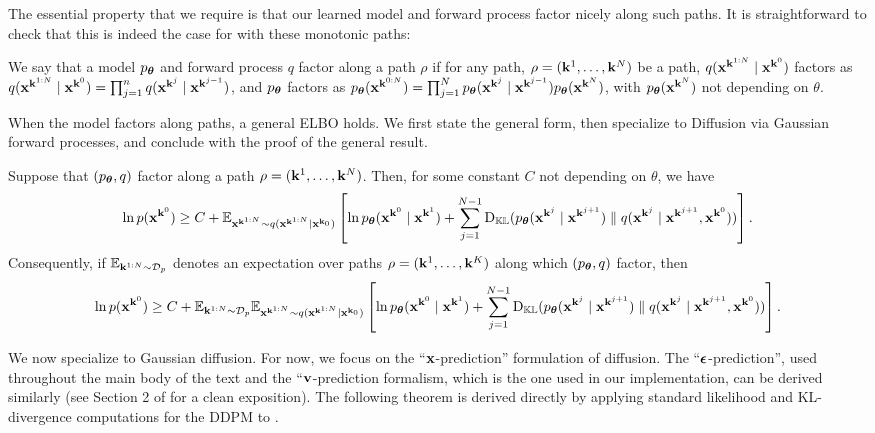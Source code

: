 The essential property that we require is that our learned model and forward process factor nicely along such paths. It is straightforward to check that this is indeed the case for \method with these monotonic paths:


\begin{definition}
\label{defn:factoring} We say that a model $p_{\bm{\theta}}$ and forward process $q$ factor along a path $\rho$ if for any path, $\rho = (\mathbf{k}^1,\dots,\mathbf{k}^N)$ be a path,  $q({\mathbf{x}}^{\mathbf{k}^{1:N}}
 \mid {\mathbf{x}}^{\mathbf{k}^0})$ factors as $q({\mathbf{x}}^{\mathbf{k}^{1:N}}
 \mid {\mathbf{x}}^{\mathbf{k}^0}) = \prod_{j=1}^n q({\mathbf{x}}^{\mathbf{k}^j}\mid {\mathbf{x}}^{\mathbf{k}^{j-1}})$, and  $p_{\bm{\theta}} $ factors as $p_{\bm{\theta}}({\mathbf{x}}^{\mathbf{k}^{0:N}}) = \prod_{j=1}^N p_{\bm{\theta}}({\mathbf{x}}^{\mathbf{k}^j}\mid {\mathbf{x}}^{\mathbf{k}^{j-1}})p_{\bm{\theta}}({\mathbf{x}}^{\mathbf{k}^N})$, with $p_{\bm{\theta}}({\mathbf{x}}^{\mathbf{k}^N})$ not depending on $\theta$. 
\end{definition}
When the model factors along paths, a general ELBO holds. We first state the general form, then specialize to Diffusion via Gaussian forward processes, and conclude with the proof of the general result.
\begin{theorem}\label{thm:ELBO} Suppose that $(p_{\bm{\theta}},q)$ factor along a path $\rho = (\mathbf{k}^1,\dots,\mathbf{k}^N)$. Then, for some constant $C$ not depending on $\theta$, we have
 \begin{align}
     \ln p({\mathbf{x}}^{\mathbf{k}^0}) \ge C + \mathbb{E}_{{\mathbf{x}}^{\mathbf{k}^{1:N}} \sim q({\mathbf{x}}^{\mathbf{k}^{1:N}}\mid {\mathbf{x}}^{\mathbf{k}_0})}\left[\ln {p_{\bm{\theta}}({\mathbf{x}}^{\mathbf{k}^0} \mid {\mathbf{x}}^{\mathbf{k}^1})} + \sum_{j=1}^{N-1} \mathrm{D}_{\mathbb{KL}}({p_{\bm{\theta}}({\mathbf{x}}^{\mathbf{k}^{j}} \mid {\mathbf{x}}^{\mathbf{k}^{j+1}})}\parallel {q({\mathbf{x}}^{\mathbf{k}^{j}} \mid {\mathbf{x}}^{\mathbf{k}^{j+1}},{\mathbf{x}}^{\mathbf{k}^0})})\right].
 \end{align}
 Consequently, if $\mathbb{E}_{\mathbf{k}^{1:N} \sim {\mathcal{D}}_{p}}$ denotes an expectation over paths $\rho = (\mathbf{k}^1,\dots,\mathbf{k}^K)$ along which $(p_{\bm{\theta}},q)$ factor, then 
    \begin{align*}
     \ln p({\mathbf{x}}^{\mathbf{k}^0}) \ge C + \mathbb{E}_{\mathbf{k}^{1:N} \sim {\mathcal{D}}_{p}}\mathbb{E}_{{\mathbf{x}}^{\mathbf{k}^{1:N}} \sim q({\mathbf{x}}^{\mathbf{k}^{1:N}}\mid {\mathbf{x}}^{\mathbf{k}_0})}\left[\ln {p_{\bm{\theta}}({\mathbf{x}}^{\mathbf{k}^0} \mid {\mathbf{x}}^{\mathbf{k}^1})} + \sum_{j=1}^{N-1} \mathrm{D}_{\mathbb{KL}}({p_{\bm{\theta}}({\mathbf{x}}^{\mathbf{k}^{j}} \mid {\mathbf{x}}^{\mathbf{k}^{j+1}})}\parallel {q({\mathbf{x}}^{\mathbf{k}^{j}} \mid {\mathbf{x}}^{\mathbf{k}^{j+1}},{\mathbf{x}}^{\mathbf{k}^0})})\right].
 \end{align*}
\end{theorem}


We now specialize  to Gaussian diffusion. For now, we focus on the ``${\mathbf{x}}$-prediction'' formulation of diffusion. The ``$\bm{\epsilon}$-prediction'', used throughout the main body of the text and the ``${\mathbf{v}}$-prediction formalism, which is the one used in our implementation, can be derived similarly (see Section 2 of \cite{chan2024tutorial} for a clean exposition). The following theorem is derived directly by applying standard likelihood and KL-divergence computations for the DDPM \cite{ho2020denoising,chan2024tutorial} to .  
\newcommand{\xthet}{\hat{\bx}_{\bm\theta}}
\newcommand{\mutheta}{\mu_{\bm{\theta}}}


